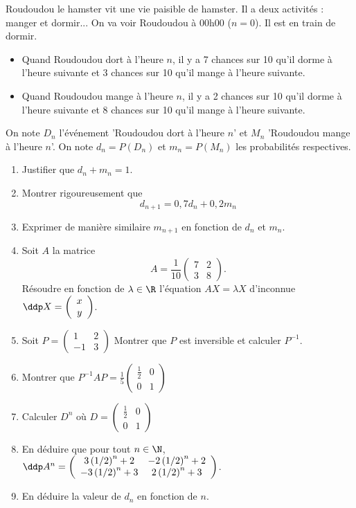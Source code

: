 \begin{exercice}
Roudoudou le hamster vit une vie paisible de hamster. Il a deux activités : manger et  dormir... 
On va voir Roudoudou à 00h00 ($n=0$). Il est en train de dormir. 
\begin{itemize}
\item Quand Roudoudou dort à l'heure $n$, il y a 7 chances sur 10 qu'il dorme à l'heure suivante et 3 chances sur 10 qu'il mange à l'heure suivante. 
\item Quand Roudoudou mange à l'heure $n$, il y a 2 chances sur 10 qu'il dorme à l'heure suivante et 8 chances sur 10 qu'il mange à l'heure suivante. 
\end{itemize}


On note $D_n$ l'événement 'Roudoudou dort à l'heure $n$' et $M_n$ 'Roudoudou mange à l'heure $n$'. On note $d_n =P(D_n)$ et $m_n=P(M_n)$ les probabilités respectives. 


\begin{enumerate}
\item Justifier que $d_n+m_n=1$. 
\item Montrer rigoureusement que $$d_{n+1} =  0,7d_n+0,2m_n$$
\item Exprimer de manière similaire $m_{n+1} $ en fonction de $d_n$ et $m_n$. 

\item Soit $A$ la matrice $$A=\frac{1}{10}\left(\begin{array}{ccc}
7 & 2\\
3 & 8
\end{array}
\right).$$
Résoudre en fonction de $\lambda \in \R$ l'équation $AX = \lambda X$ d'inconnue $\ddp X =\left(\begin{array}{c}
x \\
y 
\end{array}
\right)$. 
\item Soit $P = 
\left(\begin{array}{cc}
1 & 2\\	
-1 & 3
\end{array}
\right)$ Montrer que $P$ est inversible et calculer $P^{-1}$. 
\item Montrer que $P^{-1} A P =\frac{1}{5} \left(\begin{array}{cc}
 \frac{1}{2}& 0\\
0 &  1 
\end{array}
\right)$
\item Calculer $D^n$ où $D=\left(\begin{array}{cc}
 \frac{1}{2}& 0\\
0 &  1 
\end{array}
\right)$

\item En déduire que pour tout  $n\in \N$, $\ddp A^n=\left(\begin{array}{ccc}
3\left( 1/2\right)^n +2 & -2\left( 1/2\right)^n +2\\
-3\left( 1/2\right)^n +3& 2\left( 1/2\right)^n +3
\end{array}
\right)$.
\item En déduire la valeur de $d_n$ en fonction de $n$. 
\end{enumerate}
\end{exercice}
